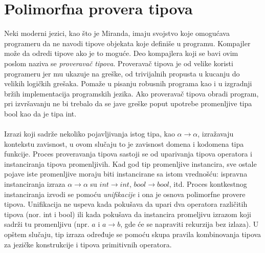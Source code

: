 
\section{Polimorfna provera tipova}
\label{sec:provera tipova}


Neki moderni jezici, kao što je Miranda, imaju svojstvo koje omogućava programeru da ne navodi tipove objekata koje definiše u programu. Kompajler može da odredi tipove ako je to moguće. Deo kompajlera koji se bavi ovim poslom naziva se \textit{proveravač tipova}. Proveravač tipova je od velike koristi programeru jer mu ukazuje na greške, od trivijalnih propusta u kucanju do velikih logičkih grešaka. Pomaže u pisanju robusnih programa kao i u izgradnji bržih implementacija programskih jezika. Ako proveravač tipova obradi program, pri izvršavanju ne bi trebalo da se jave greške poput upotrebe promenljive tipa bool kao da je tipa int.
\\
\\ %

Izrazi koji sadrže nekoliko pojavljivanja istog tipa, kao $\alpha \longrightarrow \alpha$, izražavaju kontekstu zavisnost, u ovom slučaju to je zavisnost domena i kodomena tipa funkcije. Proces proveravanja tipova sastoji se od uparivanja tipova operatora i instanciranja tipova promenljivih. Kad god tip promenljive instancira, sve ostale pojave iste promenljive moraju biti instancirane sa istom vrednošću: ispravna instanciranja izraza $\alpha \longrightarrow \alpha$ su $int \longrightarrow int$,  $bool \longrightarrow bool$, itd. Proces kontkestnog instanciranja izvodi se pomoću \textit{unifikacije} i ona je osnova polimorfne provere tipova. Unifikacija ne uspeva kada pokušava da upari dva operatora različitih tipova (nor. int i bool) ili kada pokušava da instancira promeljivu izrazom koji sadrži tu promenljivu (npr. $a$ i $a\longrightarrow b$, gde će se napraviti rekurzija bez izlaza). %
U opštem slučaju, tip izraza određuje se pomoću skupa pravila kombinovanja tipova za jezičke konstrukcije i tipova primitivnih operatora. 

\iffalse
